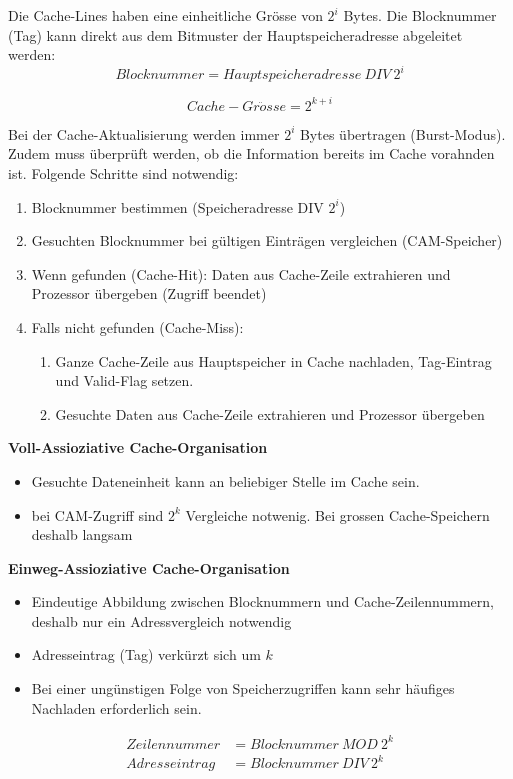 Die Cache-Lines haben eine einheitliche Grösse von $2^i$ Bytes.
Die Blocknummer (Tag) kann direkt aus dem Bitmuster der Hauptspeicheradresse abgeleitet werden:
\begin{equation*}
	Blocknummer = Hauptspeicheradresse \ DIV \ 2^i
\end{equation*}

\begin{equation*}
	Cache-Gr\ddot{o}sse = 2^{k+i}
\end{equation*}

Bei der Cache-Aktualisierung werden immer $2^i$ Bytes übertragen (Burst-Modus).
Zudem muss überprüft werden, ob die Information bereits im Cache vorahnden ist.
Folgende Schritte sind notwendig:
\begin{enumerate}[noitemsep,topsep=0pt]
	\item Blocknummer bestimmen (Speicheradresse DIV $2^i$)
	\item Gesuchten Blocknummer bei gültigen Einträgen vergleichen (CAM-Speicher)
	\item Wenn gefunden (Cache-Hit): Daten aus Cache-Zeile extrahieren und Prozessor übergeben (Zugriff beendet)
	\item Falls nicht gefunden (Cache-Miss):
	\begin{enumerate}[noitemsep,topsep=0pt]
		\item Ganze Cache-Zeile aus Hauptspeicher in Cache nachladen, Tag-Eintrag und Valid-Flag setzen.
		\item Gesuchte Daten aus Cache-Zeile extrahieren und Prozessor übergeben
	\end{enumerate}
\end{enumerate}

	\textbf{Voll-Assioziative Cache-Organisation}
	\begin{itemize}[noitemsep,topsep=0pt]
		\item Gesuchte Dateneinheit kann an beliebiger Stelle im Cache sein.
		\item bei CAM-Zugriff sind $2 ^k$ Vergleiche notwenig. Bei grossen Cache-Speichern deshalb langsam
	\end{itemize}

	\textbf{Einweg-Assioziative Cache-Organisation}
	\begin{itemize}[noitemsep,topsep=0pt]
		\item Eindeutige Abbildung zwischen Blocknummern und Cache-Zeilennummern, deshalb nur ein Adressvergleich notwendig
		\item Adresseintrag (Tag) verkürzt sich um $k$
		\item Bei einer ungünstigen Folge von Speicherzugriffen kann sehr häufiges Nachladen erforderlich sein.
	\end{itemize}
	\begin{align*}
		Zeilennummer &= Blocknummer \ MOD \ 2^k\\
		Adresseintrag &= Blocknummer \ DIV \ 2^k
	\end{align*}

